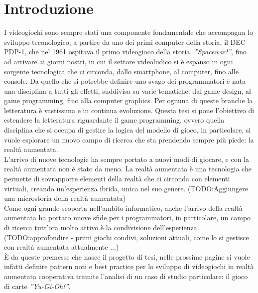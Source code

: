 \chapter{Introduzione}\label{chap:Introduzione}

I videogiochi sono sempre stati una componente fondamentale che accompagna lo 
sviluppo teconologico, a partire da uno dei primi computer della storia, il DEC PDP-1,
che nel 1961 ospitava il primo videogioco della storia, \textit{''Spacewar!''}, fino ad arrivare
ai giorni nostri, in cui il settore videoludico si è espanso in ogni sorgente tecnologica
che ci circonda, dallo smartphone, al computer, fino alle console. Da quello che si 
potrebbe definire uno svago dei programmatori è nata una disciplina a tutti gli effetti,
suddivisa su varie tematiche: dal game design, al game programming, fino alla computer
graphics. Per ognuna di queste branche la letteratura è vastissima e in continua
evoluzione. Questa tesi si pone l'obiettivo di estendere la letteratura riguardante
il game programming, ovvero quella disciplina che si occupa di gestire la logica
del modello di gioco, in particolare, si vuole esplorare un nuovo campo di ricerca
che sta prendendo sempre più piede: la realtà aumentata.\\\newline
L'arrivo di nuove tecnologie ha sempre portato a nuovi modi di giocare, e con la 
realtà aumentata non è stato da meno. La realtà aumentata è una tecnologia che 
permette di sovrapporre elementi della realtà che ci circonda con elementi virtuali, 
creando un'esperienza ibrida, unica nel suo genere. (TODO:Aggiungere una microstoria della realtà aumentata)\\\newline
Come ogni grande scoperta nell'ambito informatico, anche l'arrivo della realtà 
aumentata ha portato nuove sfide per i programmatori, in particolare, un campo di ricerca tutt'ora molto attivo è la condivisione 
dell'esperienza. (TODO:approfondire - primi giochi condivi, soluzioni attuali, come lo si gestisce con realtà aumentata attualmente ...)\\\newline
È da queste premesse che nasce il progetto di tesi, nelle prossime
pagine si vuole infatti definire pattern noti e best practice per lo sviluppo di 
videogiochi in realtà aumentata cooperativa tramite l'analisi di un caso di studio
particolare: il gioco di carte \textit{''Yu-Gi-Oh!''}.\\
\\
